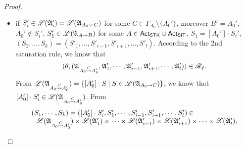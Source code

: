 \begin{proof}
{\begin{itemize}
\begin{itemize}
$$\begin{array}{l}
                \ \ \Lang(\Aut_{B'}) \times \Lang(\Aut_1') \times \cdots \times \Lang(\Aut_{i-1}') \times \Lang(\Aut_{i+1}')\times \cdots \times \Lang(\Aut_{l}'),
            \end{array}
            $$  
            we conclude that the claim holds for $n$ in this subcase. 
            \item if $S_i'\in\Lang(\Aut_i') = \Lang(\Aut_{A_0\rightsquigarrow C})$ for some $C\in\Gamma_{A_0}\setminus\{A_0'\}$, moreover $B' = A_0'$, $A_0'\notin S_i'$, $S_1' \in \Lang(\Aut_{A\rightsquigarrow B})$ for some $A\in\act_\STK\cup\act_\SIT$, $S_1 = [A_0']\cdot S_i'$, $(S_2, \dots, S_k) = (S'_1, \dots, S'_{i-1}, S'_{i+1}, \dots, S'_l)$. According to the 2nd saturation rule, we know that 
            $$(\theta, (\Aut_{A_0\stackrel{C}\rightsquigarrow A_0'}, \Aut_1',\cdots, \Aut_{i-1}', \Aut_{i+1}', \cdots, \Aut_{l}')) \in \AutReach_f.$$
            From $\Lang(\Aut_{A_0\stackrel{C}\rightsquigarrow A_0'}) = \{[A_0']\cdot S\mid S \in \Lang(\Aut_{A_0\rightsquigarrow C})\}$, we know that $[A_0']\cdot S_i'\in \Lang(\Aut_{A_0\stackrel{C}\rightsquigarrow A_0'})$. From
            $$
            \begin{array}{l}
                (S_1,\cdots,S_k) = ([A_0']\cdot S_i', S_1', \cdots, S_{i-1}', S_{i+1}', \cdots, S_l') \in \\
                \ \ \Lang(\Aut_{A_0\stackrel{C}\rightsquigarrow A_0'}) \times \Lang(\Aut_1') \times \cdots \times \Lang(\Aut_{i-1}') \times \Lang(\Aut_{i+1}')\times \cdots \times \Lang(\Aut_{l}'),

\end{array}$$
\end{itemize}
\end{itemize}}
\end{proof}
